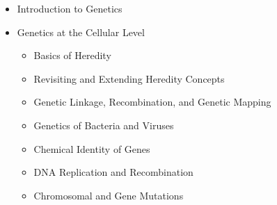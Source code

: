 \documentclass[12pt]{article}
\begin{document}
\begin{itemize}
    \item Introduction to Genetics
    \item Genetics at the Cellular Level
    \begin{itemize}
        \item Basics of Heredity
        \item Revisiting and Extending Heredity Concepts
        \item Genetic Linkage, Recombination, and Genetic Mapping
        \item Genetics of Bacteria and Viruses
        \item Chemical Identity of Genes
        \item DNA Replication and Recombination
        \item Chromosomal and Gene Mutations
    \end{itemize}


\end{itemize}
\end{document}
